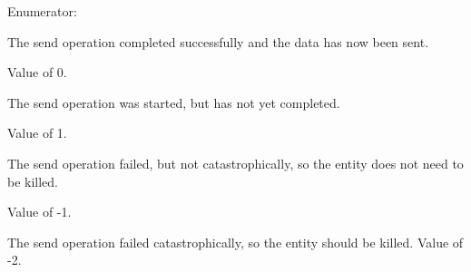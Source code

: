 \begin{Desc}
\item[Enumerator: ]\par
\begin{description}
\item[{\em 
\hypertarget{class_net_utility_a8051eca61204ffd818281419bbf44736acec16f03b79a6de35d6ab9d5ceb58ff7}{
SEND\_\-COMPLETED}
\label{class_net_utility_a8051eca61204ffd818281419bbf44736acec16f03b79a6de35d6ab9d5ceb58ff7}
}]The send operation completed successfully and the data has now been sent. \par
 Value of 0. \item[{\em 
\hypertarget{class_net_utility_a8051eca61204ffd818281419bbf44736a802cb48d857d70f62624326eea294406}{
SEND\_\-IN\_\-PROGRESS}
\label{class_net_utility_a8051eca61204ffd818281419bbf44736a802cb48d857d70f62624326eea294406}
}]The send operation was started, but has not yet completed.\par
 Value of 1. \item[{\em 
\hypertarget{class_net_utility_a8051eca61204ffd818281419bbf44736a27389038f252e2ad34e12b28c9f93a00}{
SEND\_\-FAILED}
\label{class_net_utility_a8051eca61204ffd818281419bbf44736a27389038f252e2ad34e12b28c9f93a00}
}]The send operation failed, but not catastrophically, so the entity does not need to be killed.\par
 Value of -\/1. \item[{\em 
\hypertarget{class_net_utility_a8051eca61204ffd818281419bbf44736abc96a939bc1f0dfffc56f4568ce9dad4}{
SEND\_\-FAILED\_\-KILL}
\label{class_net_utility_a8051eca61204ffd818281419bbf44736abc96a939bc1f0dfffc56f4568ce9dad4}
}]The send operation failed catastrophically, so the entity should be killed. Value of -\/2. \end{description}
\end{Desc}




